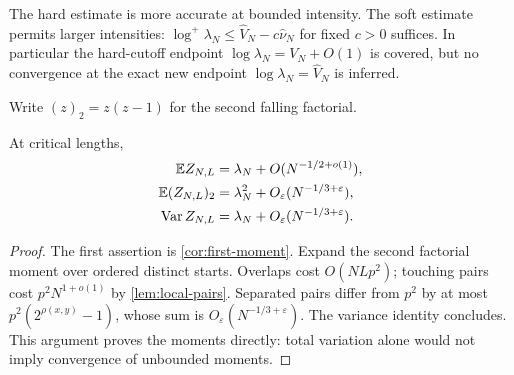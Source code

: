 The hard estimate is more accurate at bounded intensity. The soft estimate
permits larger intensities: $\log^+\lambda_N\le\widehat V_N-c\widehat\nu_N$
for fixed $c>0$ suffices. In particular the hard-cutoff endpoint
$\log\lambda_N=V_N+O(1)$ is covered, but no convergence at the exact
new endpoint $\log\lambda_N=\widehat V_N$ is inferred.

Write $(z)_2=z(z-1)$ for the second falling factorial.
\begin{corollary}\label{cor:moments}
At critical lengths,
\begin{align*}
 \mathbb E Z_{N,L}&=\lambda_N+O(N^{-1/2+o(1)}),\\
 \mathbb E(Z_{N,L})_2&=\lambda_N^2+O_\varepsilon(N^{-1/3+\varepsilon}),\\
 \operatorname{Var}Z_{N,L}&=\lambda_N+O_\varepsilon(N^{-1/3+\varepsilon}).
\end{align*}
\end{corollary}
\begin{proof}
The first assertion is \cref{cor:first-moment}. Expand the second factorial
moment over ordered distinct starts. Overlaps cost $O(NLp^2)$;
touching pairs cost $p^2N^{1+o(1)}$ by \cref{lem:local-pairs}.
Separated pairs differ from $p^2$ by at most
$p^2(2^{\rho(x,y)}-1)$, whose sum is
$O_\varepsilon(N^{-1/3+\varepsilon})$. The variance identity concludes.
This argument proves the moments directly: total variation alone would
not imply convergence of unbounded moments.
\end{proof}
